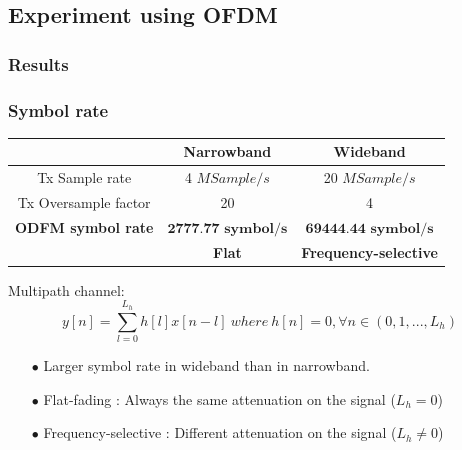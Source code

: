 \documentclass[11pt]{beamer}
\begin{document}
\subsection{Experiment using OFDM}
\subsubsection{Results}

\begin{frame}
\frametitle{Symbol rate}
\begin{center}
	\begin{tabular}{c|c|c}
		  & Narrowband & Wideband\\
		  \hline
	Tx Sample rate & 4 $MSample/s$ & 20 $MSample/s$ \\	  
	Tx Oversample factor & 20 & 4\\
	\textbf{ODFM symbol rate} &  $\textbf{2777.77 symbol/s}$ & $\textbf{69444.44 symbol/s}$ \\ 
	\hline
     & \color{red} \textbf{Flat}  & \color{red} \textbf{Frequency-selective}\\                               
	\end{tabular}
	\label{tab1}
\end{center}
Multipath channel:	
\begin{equation}
y[n]=\sum_{l=0}^{L_h} h[l]x[n-l]~where~h[n]=0, \forall n \in (0,1,...,L_h)
\end{equation}
\begin{itemize}
\item[$\bullet$] Larger symbol rate in wideband than in narrowband.
\item[$\bullet$] Flat-fading : Always the same attenuation on the signal ($L_h=0$)
\item[$\bullet$] Frequency-selective : Different attenuation on the signal ($L_h \neq 0$)
\end{itemize}

\end{frame}
\end{document}
